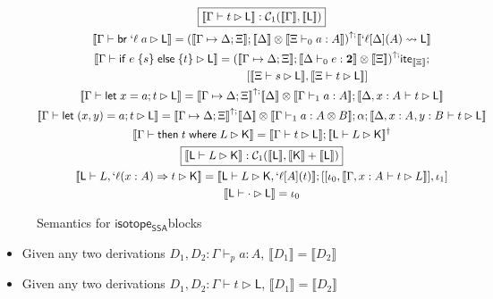 \documentclass[acmsmall,screen,review]{acmart}
\newcommand{\mc}[1]{\ensuremath{\mathcal{#1}}}
\newcommand{\mb}[1]{\ensuremath{\mathbf{#1}}}
\newcommand{\ms}[1]{\ensuremath{\mathsf{#1}}}
\newcommand{\lbl}[1]{{`#1}}
\newcommand{\lto}{\Rightarrow}
\newcommand{\letstmt}[3]{\ensuremath{\ms{let}\;#1 = #2; #3}}
\newcommand{\brb}[2]{\ms{br}\;#1\;#2}
\newcommand{\lbrb}[2]{\brb{\lbl{#1}}{#2}}
\newcommand{\ite}[3]{\ms{if}\;#1\;\{#2\}\;\ms{else}\;\{#3\}}
\newcommand{\ewhere}[2]{\ms{then}\;#1\;\ms{where}\;#2}
\newcommand{\wbranch}[3]{#1(#2) \lto #3}
\newcommand{\lwbranch}[3]{\wbranch{\lbl{#1}}{#2}{#3}}
\newcommand{\csplits}[3]{#1 \mapsto #2;#3}
\newcommand{\lwk}[2]{#1 \rightsquigarrow #2}
\newcommand{\thyp}[3]{#1: {#2}^{#3}}
\newcommand{\lhyp}[3]{#1[#2](#3)}
\newcommand{\llhyp}[3]{\lhyp{\lbl{#1}}{#2}{#3}}
\newcommand{\hasty}[4]{#1 \vdash_{#2} #3: #4}
\newcommand{\haslb}[3]{#1 \vdash #2 \rhd #3}
\newcommand{\lhaslb}[3]{#1 \vdash #2 \rhd #3}
\newcommand{\dnt}[1]{\llbracket{#1}\rrbracket}
\newcommand{\upg}[2]{{#1}^{\uparrow #2}}
\newcommand{\isotopessa}{\ms{isotope_{SSA}}}
\begin{document}
\begin{figure}
  \begin{gather*}
    \boxed{\dnt{\haslb{\Gamma}{t}{\ms{L}}}
      : \mc{C}_1(\dnt{\Gamma}, \dnt{\ms{L}})} \\
    \dnt{\haslb{\Gamma}{\lbrb{\ell}{a}}{\ms{L}}}
      = \upg{(\dnt{\csplits{\Gamma}{\Delta}{\Xi}}
      ; \dnt{\Delta} \otimes \dnt{\hasty{\Xi}{0}{a}{A}})}
      ; \dnt{\lwk{\llhyp{\ell}{\Delta}{A}}{\ms{L}}} \\
    \dnt{\haslb{\Gamma}{\ite{e}{s}{t}}{\ms{L}}}
      = \upg{(\dnt{\csplits{\Gamma}{\Delta}{\Xi}}
      ; \dnt{\hasty{\Delta}{0}{e}{\mb{2}}} \otimes \dnt{\Xi})}
      ; \ms{ite}_{\dnt{\Xi}} ;
      \\ \qquad \qquad \qquad \qquad
      [
        \dnt{\haslb{\Xi}{s}{\ms{L}}}, 
        \dnt{\haslb{\Xi}{t}{\ms{L}}} 
      ]
      \\
    \dnt{\haslb{\Gamma}{\letstmt{x}{a}{t}}{\ms{L}}}
      = \upg{\dnt{\csplits{\Gamma}{\Delta}{\Xi}}}
      ; \dnt{\Delta} \otimes \dnt{\hasty{\Gamma}{1}{a}{A}}
      ; \dnt{\haslb{\Delta, \thyp{x}{A}{}}{t}{\ms{L}}}
      \\
    \dnt{\haslb{\Gamma}{\letstmt{(x, y)}{a}{t}}{\ms{L}}}
      = \upg{\dnt{\csplits{\Gamma}{\Delta}{\Xi}}}
        ; \dnt{\Delta} \otimes \dnt{\hasty{\Gamma}{1}{a}{A \otimes B}}
        ; \alpha
        ; \dnt{\haslb{\Delta, \thyp{x}{A}{}, \thyp{y}{B}{}}{t}{\ms{L}}}
      \\
    \dnt{\haslb{\Gamma}{\ewhere{t}{L}}{\ms{K}}}
      = \dnt{\haslb{\Gamma}{t}{\ms{L}}}
      ; \dnt{\lhaslb{\ms{L}}{L}{\ms{K}}}^\dagger
      \\
    \boxed{\dnt{\lhaslb{\ms{L}}{L}{\ms{K}}}
      : \mc{C}_1(\dnt{\ms{L}}, \dnt{\ms{K}} + \dnt{\ms{L}})}
      \\
    \dnt{\lhaslb{\ms{L}}{L, \lwbranch{\ell}{x: A}{t}}{\ms{K}}}
      = \dnt{\lhaslb{\ms{L}}{L}{\ms{K}, \llhyp{\ell}{A}{t}}}
      ; [[\iota_0, \dnt{\haslb{\Gamma, \thyp{x}{A}{}}{t}{L}}], \iota_1]
      \\
    \dnt{\lhaslb{\ms{L}}{\cdot}{\ms{L}}}
      = \iota_0
  \end{gather*}
  \caption{Semantics for \isotopessa blocks}
  \label{fig:ssa-structural-blocks}
\end{figure}

\begin{theorem}[Coherence]
  \begin{itemize}
    \item Given any two derivations \(D_1, D_2: \hasty{\Gamma}{p}{a}{A}\), \(\dnt{D_1} = \dnt{D_2}\)
    \item Given any two derivations \(D_1, D_2: \haslb{\Gamma}{t}{\ms{L}}\), \(\dnt{D_1} = \dnt{D_2}\)
  \end{itemize}
\end{theorem}
\end{document}
